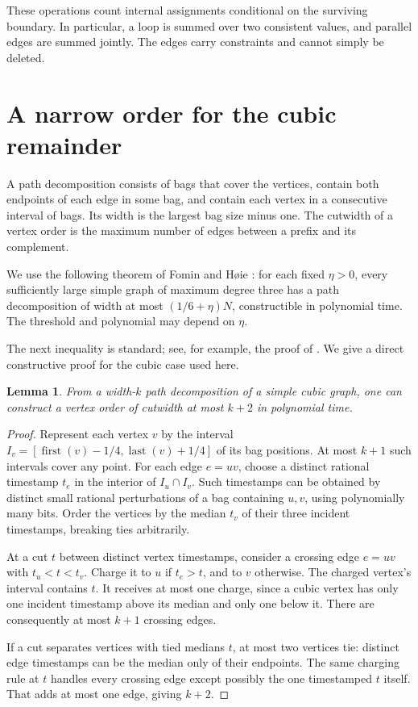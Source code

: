 \documentclass[11pt]{article}
\newtheorem{lemma}[theorem]{Lemma}
\begin{document}
These operations count internal assignments conditional on the
surviving boundary. In particular, a loop is summed over two
consistent values, and parallel edges are summed jointly. The
edges carry constraints and cannot simply be deleted.

\section{A narrow order for the cubic remainder}

A path decomposition consists of bags that cover the vertices,
contain both endpoints of each edge in some bag, and contain each
vertex in a consecutive interval of bags. Its width is the largest
bag size minus one. The cutwidth of a vertex order is the maximum
number of edges between a prefix and its complement.

We use the following theorem of Fomin and H\o ie
\citep[Theorem 5 and Section 4]{FominHoie2006}: for each fixed
$\eta>0$, every sufficiently large simple graph of maximum degree
three has a path decomposition of width at most $(1/6+\eta)N$,
constructible in polynomial time. The threshold and polynomial
may depend on $\eta$.

The next inequality is standard; see, for example, the proof of
\citet[Lemma 16]{Bodlaender2025}. We give a direct constructive proof
for the cubic case used here.

\begin{lemma}\label{lem:width}
From a width-$k$ path decomposition of a simple cubic graph, one can
construct a vertex order of cutwidth at most $k+2$ in polynomial time.
\end{lemma}
\begin{proof}
Represent each vertex $v$ by the interval
$I_v=[\operatorname{first}(v)-1/4,\operatorname{last}(v)+1/4]$ of
its bag positions. At most $k+1$ such intervals cover any point.
For each edge $e=uv$, choose a distinct rational timestamp $t_e$
in the interior of $I_u\cap I_v$. Such timestamps can be obtained
by distinct small rational perturbations of a bag containing $u,v$,
using polynomially many bits. Order the vertices by the median
$t_v$ of their three incident timestamps, breaking ties arbitrarily.

At a cut $t$ between distinct vertex timestamps, consider a crossing
edge $e=uv$ with $t_u<t<t_v$. Charge it to $u$ if $t_e>t$, and to
$v$ otherwise. The charged vertex's interval contains $t$. It
receives at most one charge, since a cubic vertex has only one
incident timestamp above its median and only one below it.
There are consequently at most $k+1$ crossing edges.

If a cut separates vertices with tied medians $t$, at most two
vertices tie: distinct edge timestamps can be the median only of
their endpoints. The same charging rule at $t$ handles every
crossing edge except possibly the one timestamped $t$ itself.
That adds at most one edge, giving $k+2$.
\end{proof}
\end{document}
